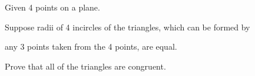 Given 4 points on a plane. 

Suppose radii of 4 incircles of the triangles, which can be formed by 

any 3 points taken from the 4 points, are equal.

Prove that all of the triangles are congruent.
